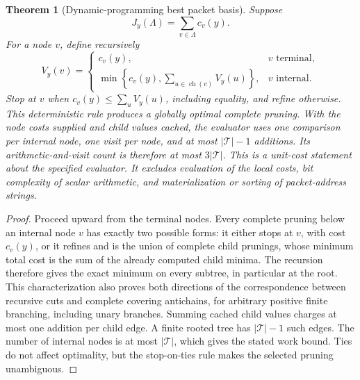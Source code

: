 \documentclass[11pt,letterpaper]{article}
\newtheorem{theorem}{Theorem}[section]
\theoremstyle{plain}
\theoremstyle{plain}
\theoremstyle{plain}
\theoremstyle{definition}
\theoremstyle{definition}
\theoremstyle{definition}
\theoremstyle{definition}
\theoremstyle{remark}
\theoremstyle{remark}
\theoremstyle{remark}
\theoremstyle{remark}
\begin{document}
\begin{theorem}[Dynamic-programming best packet basis]\label{result:15}
Suppose
\[
J_y(\Lambda)=\sum_{v\in\Lambda}c_v(y).
\]
For a node $v$, define recursively
\[
V_y(v)
=
\begin{cases}
c_v(y),&v\text{ terminal},\\[2mm]
\displaystyle
\min\left\{c_v(y),\sum_{u\in\operatorname{ch}(v)}V_y(u)\right\},
&v\text{ internal}.
\end{cases}
\]
Stop at $v$ when $c_v(y)\le\sum_uV_y(u)$, including equality, and refine otherwise. This deterministic rule produces a globally optimal complete pruning. With the node costs supplied and child values cached, the evaluator uses one comparison per internal node, one visit per node, and at most $|\mathcal T|-1$ additions. Its arithmetic-and-visit count is therefore at most $3|\mathcal T|$. This is a unit-cost statement about the specified evaluator. It excludes evaluation of the local costs, bit complexity of scalar arithmetic, and materialization or sorting of packet-address strings.
\end{theorem}

\begin{proof}
Proceed upward from the terminal nodes.  Every complete pruning below an internal node $v$ has exactly two possible forms: it either stops at $v$, with cost $c_v(y)$, or it refines and is the union of complete child prunings, whose minimum total cost is the sum of the already computed child minima.  The recursion therefore gives the exact minimum on every subtree, in particular at the root. This characterization also proves both directions of the correspondence between recursive cuts and complete covering antichains, for arbitrary positive finite branching, including unary branches. Summing cached child values charges at most one addition per child edge. A finite rooted tree has $|\mathcal T|-1$ such edges. The number of internal nodes is at most $|\mathcal T|$, which gives the stated work bound. Ties do not affect optimality, but the stop-on-ties rule makes the selected pruning unambiguous.
\end{proof}
\end{document}
